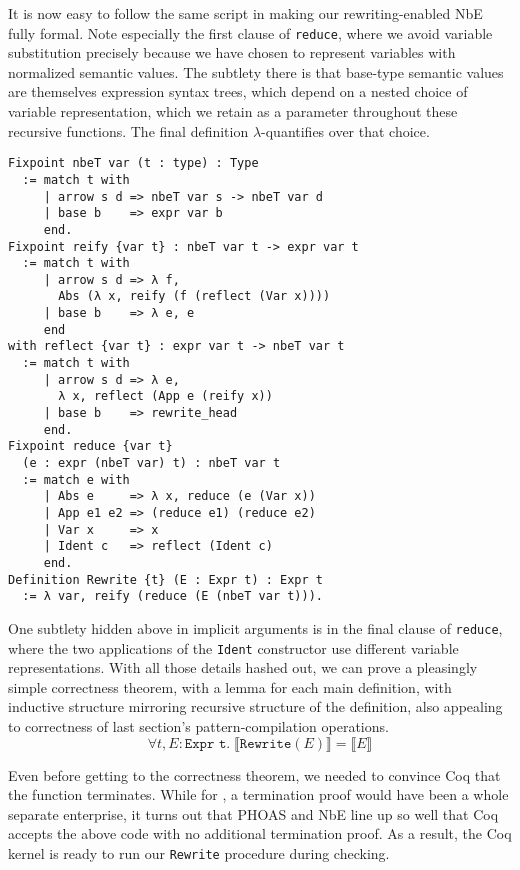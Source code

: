 \documentclass[sigplan,10pt,review,anonymous]{acmart}\settopmatter{printfolios=true,printccs=false,printacmref=false}
\begin{document}
It is now easy to follow the same script in making our rewriting-enabled NbE fully formal.
Note especially the first clause of \texttt{reduce}, where we avoid variable substitution precisely because we have chosen to represent variables with normalized semantic values.
The subtlety there is that base-type semantic values are themselves expression syntax trees, which depend on a nested choice of variable representation, which we retain as a parameter throughout these recursive functions.
The final definition $\lambda$-quantifies over that choice.
\begin{verbatim}
Fixpoint nbeT var (t : type) : Type
  := match t with
     | arrow s d => nbeT var s -> nbeT var d
     | base b    => expr var b
     end.
Fixpoint reify {var t} : nbeT var t -> expr var t
  := match t with
     | arrow s d => λ f,
       Abs (λ x, reify (f (reflect (Var x))))
     | base b    => λ e, e
     end
with reflect {var t} : expr var t -> nbeT var t
  := match t with
     | arrow s d => λ e,
       λ x, reflect (App e (reify x))
     | base b    => rewrite_head
     end.
Fixpoint reduce {var t}
  (e : expr (nbeT var) t) : nbeT var t
  := match e with
     | Abs e     => λ x, reduce (e (Var x))
     | App e1 e2 => (reduce e1) (reduce e2)
     | Var x     => x
     | Ident c   => reflect (Ident c)
     end.
Definition Rewrite {t} (E : Expr t) : Expr t
  := λ var, reify (reduce (E (nbeT var t))).
\end{verbatim}

One subtlety hidden above in implicit arguments is in the final clause of \texttt{reduce}, where the two applications of the \texttt{Ident} constructor use different variable representations.
With all those details hashed out, we can prove a pleasingly simple correctness theorem, with a lemma for each main definition, with inductive structure mirroring recursive structure of the definition, also appealing to correctness of last section's pattern-compilation operations.
$$\forall t, E : \texttt{Expr t}. \; \llbracket \texttt{Rewrite}(E) \rrbracket = \llbracket E \rrbracket$$

Even before getting to the correctness theorem, we needed to convince Coq that the function terminates.
While for \citet{Aehlig}, a termination proof would have been a whole separate enterprise, it turns out that PHOAS and NbE line up so well that Coq accepts the above code with no additional termination proof.
As a result, the Coq kernel is ready to run our \texttt{Rewrite} procedure during checking.
\end{document}

